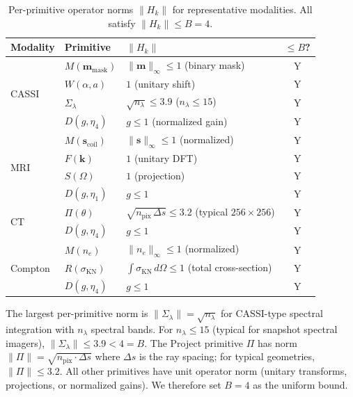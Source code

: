 \begin{table}[htbp]
\centering
\caption{Per-primitive operator norms $\|H_k\|$ for representative modalities. All satisfy $\|H_k\| \leq B = 4$.} \label{tab:supp_opnorm}
\begin{tabular}{l l l c}
\toprule
\textbf{Modality} & \textbf{Primitive} & \textbf{$\|H_k\|$} & \textbf{$\leq B$?} \\
\midrule
\multirow{4}{*}{CASSI}
  & $M(\mathbf{m}_{\mathrm{mask}})$ & $\|\mathbf{m}\|_\infty \leq 1$ (binary mask) & Y \\
  & $W(\alpha, a)$ & $1$ (unitary shift) & Y \\
  & $\Sigma_\lambda$ & $\sqrt{n_\lambda} \leq 3.9$ ($n_\lambda \leq 15$) & Y \\
  & $D(g, \eta_4)$ & $g \leq 1$ (normalized gain) & Y \\
\midrule
\multirow{4}{*}{MRI}
  & $M(\mathbf{s}_{\mathrm{coil}})$ & $\|\mathbf{s}\|_\infty \leq 1$ (normalized) & Y \\
  & $F(\mathbf{k})$ & $1$ (unitary DFT) & Y \\
  & $S(\Omega)$ & $1$ (projection) & Y \\
  & $D(g, \eta_1)$ & $g \leq 1$ & Y \\
\midrule
\multirow{2}{*}{CT}
  & $\Pi(\theta)$ & $\sqrt{n_{\mathrm{pix}}\, \Delta s} \leq 3.2$ (typical $256 \times 256$) & Y \\
  & $D(g, \eta_4)$ & $g \leq 1$ & Y \\
\midrule
\multirow{3}{*}{Compton}
  & $M(n_e)$ & $\|n_e\|_\infty \leq 1$ (normalized) & Y \\
  & $R(\sigma_{\mathrm{KN}})$ & $\int \sigma_{\mathrm{KN}}\, d\Omega \leq 1$ (total cross-section) & Y \\
  & $D(g, \eta_4)$ & $g \leq 1$ & Y \\
\bottomrule
\end{tabular}
\end{table}

The largest per-primitive norm is $\|\Sigma_\lambda\| = \sqrt{n_\lambda}$ for CASSI-type spectral integration with $n_\lambda$ spectral bands. For $n_\lambda \leq 15$ (typical for snapshot spectral imagers), $\|\Sigma_\lambda\| \leq 3.9 < 4 = B$. The Project primitive $\Pi$ has norm $\|\Pi\| = \sqrt{n_{\mathrm{pix}} \cdot \Delta s}$ where $\Delta s$ is the ray spacing; for typical geometries, $\|\Pi\| \leq 3.2$. All other primitives have unit operator norm (unitary transforms, projections, or normalized gains). We therefore set $B = 4$ as the uniform bound.


